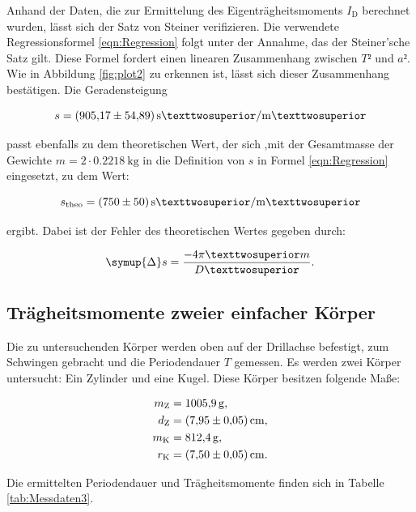 Anhand der Daten, die zur Ermittelung des Eigenträgheitsmoments $I_\text{D}$ berechnet wurden, lässt sich der
Satz von Steiner verifizieren. Die verwendete Regressionsformel \eqref{eqn:Regression} folgt unter der
Annahme, das der Steiner'sche Satz gilt. Diese Formel fordert einen linearen Zusammenhang zwischen 
$T²$ und $a²$. Wie in Abbildung \ref{fig:plot2} zu erkennen ist, lässt sich dieser Zusammenhang 
bestätigen. Die Geradensteigung

\begin{equation*}
s = \SI{905.17+-54.89}{\second²\per\meter²}
\end{equation*}

passt ebenfalls zu dem theoretischen Wert, der sich ,mit der Gesamtmasse der Gewichte  $m = 2\cdot 
\SI{0.2218}{\kilo\gram}$ in die Definition von $s$ in Formel \eqref{eqn:Regression} eingesetzt, zu 
dem Wert:

\begin{equation*}
s_\text{theo} = \SI{750+-50}{\second²\per\meter²}
\end{equation*}

ergibt.
Dabei ist der Fehler des theoretischen Wertes gegeben durch:

\begin{equation*}
\symup{\Delta} s = \frac{-4\pi²m}{D²}.
\end{equation*}

\subsection{Trägheitsmomente zweier einfacher Körper}

Die zu untersuchenden Körper werden oben auf der Drillachse befestigt, zum Schwingen gebracht 
und die Periodendauer $T$ gemessen. Es werden zwei Körper untersucht: Ein Zylinder und eine Kugel.
Diese Körper besitzen folgende Maße: 

\begin{align*}
m_\text{Z} &= \SI{1005.9}{\gram},\\
d_\text{Z} &= \SI{7.95+-0.05}{\centi\meter},\\
m_\text{K} &= \SI{812.4}{\gram},\\
r_\text{K} &= \SI{7.5+-0.05}{\centi\meter}.
\end{align*}

Die ermittelten Periodendauer und Trägheitsmomente finden sich in Tabelle \ref{tab:Messdaten3}.

